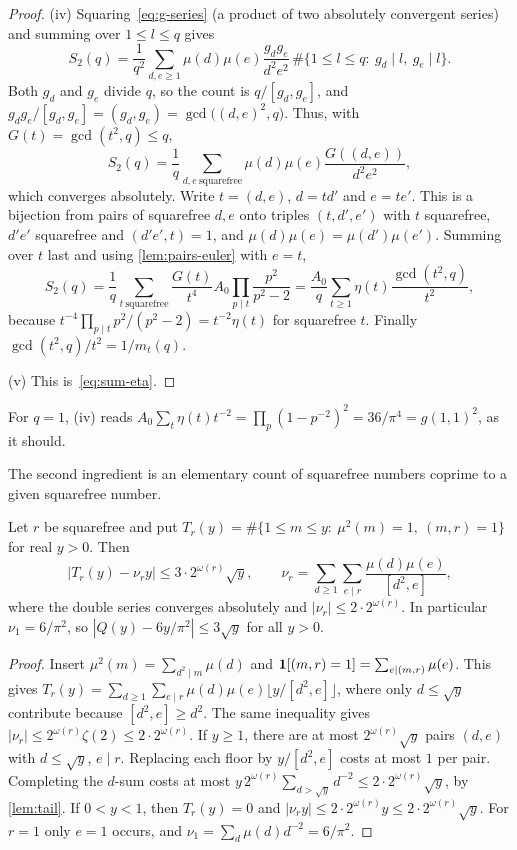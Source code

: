 \begin{proof}
(iv) Squaring~\eqref{eq:g-series} (a product of two absolutely convergent series) and summing over $1\le l\le q$ gives
\[
S_2(q)=\frac1{q^2}\sum_{d,e\ge1}\mu(d)\mu(e)\frac{g_dg_e}{d^2e^2}\,\#\{1\le l\le q:\ g_d\mid l,\ g_e\mid l\}.
\]
Both $g_d$ and $g_e$ divide $q$, so the count is $q/[g_d,g_e]$, and $g_dg_e/[g_d,g_e]=(g_d,g_e)=\gcd\bigl((d,e)^2,q\bigr)$. Thus, with $G(t)=\gcd(t^2,q)\le q$,
\[
S_2(q)=\frac1q\sum_{d,e\ \mathrm{squarefree}}\mu(d)\mu(e)\frac{G((d,e))}{d^2e^2},
\]
which converges absolutely. Write $t=(d,e)$, $d=td'$ and $e=te'$. This is a bijection from pairs of squarefree $d,e$ onto triples $(t,d',e')$ with $t$ squarefree, $d'e'$ squarefree and $(d'e',t)=1$, and $\mu(d)\mu(e)=\mu(d')\mu(e')$. Summing over $t$ last and using \cref{lem:pairs-euler} with $e=t$,
\[
S_2(q)=\frac1q\sum_{t\ \mathrm{squarefree}}\frac{G(t)}{t^4}A_0\prod_{p\mid t}\frac{p^2}{p^2-2}=\frac{A_0}{q}\sum_{t\ge1}\eta(t)\frac{\gcd(t^2,q)}{t^2},
\]
because $t^{-4}\prod_{p\mid t}p^2/(p^2-2)=t^{-2}\eta(t)$ for squarefree $t$. Finally $\gcd(t^2,q)/t^2=1/m_t(q)$.

(v) This is~\eqref{eq:sum-eta}.
\end{proof}

For $q=1$, (iv) reads $A_0\sum_t\eta(t)t^{-2}=\prod_p(1-p^{-2})^2=36/\pi^4=g(1,1)^2$, as it should.

The second ingredient is an elementary count of squarefree numbers coprime to a given squarefree number.

\begin{lemma}\label{lem:Tr}
Let $r$ be squarefree and put $T_r(y)=\#\{1\le m\le y:\ \mu^2(m)=1,\ (m,r)=1\}$ for real $y>0$. Then
\[
|T_r(y)-\nu_ry|\le3\cdot2^{\omega(r)}\sqrt y,\qquad \nu_r=\sum_{d\ge1}\sum_{e\mid r}\frac{\mu(d)\mu(e)}{[d^2,e]},
\]
where the double series converges absolutely and $|\nu_r|\le2\cdot2^{\omega(r)}$. In particular $\nu_1=6/\pi^2$, so $|Q(y)-6y/\pi^2|\le3\sqrt y$ for all $y>0$.
\end{lemma}

\begin{proof}
Insert $\mu^2(m)=\sum_{d^2\mid m}\mu(d)$ and $\mathbf{1}[(m,r)=1]=\sum_{e\mid(m,r)}\mu(e)$. This gives $T_r(y)=\sum_{d\ge1}\sum_{e\mid r}\mu(d)\mu(e)\lfloor y/[d^2,e]\rfloor$, where only $d\le\sqrt y$ contribute because $[d^2,e]\ge d^2$. The same inequality gives $|\nu_r|\le2^{\omega(r)}\zeta(2)\le2\cdot2^{\omega(r)}$. If $y\ge1$, there are at most $2^{\omega(r)}\sqrt y$ pairs $(d,e)$ with $d\le\sqrt y$, $e\mid r$. Replacing each floor by $y/[d^2,e]$ costs at most $1$ per pair. Completing the $d$-sum costs at most $y\,2^{\omega(r)}\sum_{d>\sqrt y}d^{-2}\le2\cdot2^{\omega(r)}\sqrt y$, by \cref{lem:tail}. If $0<y<1$, then $T_r(y)=0$ and $|\nu_ry|\le2\cdot2^{\omega(r)}y\le2\cdot2^{\omega(r)}\sqrt y$. For $r=1$ only $e=1$ occurs, and $\nu_1=\sum_d\mu(d)d^{-2}=6/\pi^2$.
\end{proof}

